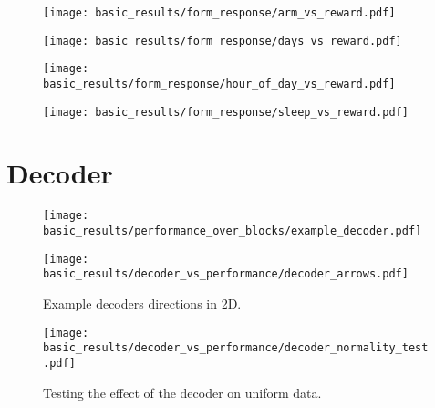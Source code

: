 \documentclass[../main.tex]{subfiles}
\begin{document}
\begin{figure}[H]
    \centering
    \texttt{[image: basic\_results/form\_response/arm\_vs\_reward.pdf]}
    \caption[Arm versus reward]{}\label{fig:arm_vs_reward}
\end{figure}

\begin{figure}[H]
    \centering
    \texttt{[image: basic\_results/form\_response/days\_vs\_reward.pdf]}
    \caption[Experiment day versus reward]{}\label{fig:days_vs_reward}
\end{figure}

\begin{figure}[H]
    \centering
    \texttt{[image: basic\_results/form\_response/hour\_of\_day\_vs\_reward.pdf]}
    \caption[Hour of day versus reward]{}\label{fig:hour_of_day_vs_reward}
\end{figure}

\begin{figure}[H]
    \centering
    \texttt{[image: basic\_results/form\_response/sleep\_vs\_reward.pdf]}
    \caption[Hours of sleep vs reward]{}\label{fig:sleep_vs_reward}
\end{figure}

















\section{Decoder}

\begin{figure}[H]
    \centering
    \texttt{[image: basic\_results/performance\_over\_blocks/example\_decoder.pdf]}
    \caption[Example subject decoder]{}\label{fig:example_decoder}
\end{figure}

\begin{figure}[H]
    \centering
    \texttt{[image: basic\_results/decoder\_vs\_performance/decoder\_arrows.pdf]}
    \caption[Example decoder directions in 2D.]{Example decoders directions in 2D.}\label{fig:decoder_arrows}
\end{figure}

\begin{figure}[H]
    \centering
    \texttt{[image: basic\_results/decoder\_vs\_performance/decoder\_normality\_test.pdf]}
    \caption[Decoder normality testing]{Testing the effect of the decoder on uniform data.}\label{fig:decoder_normality}
\end{figure}
\end{document}
